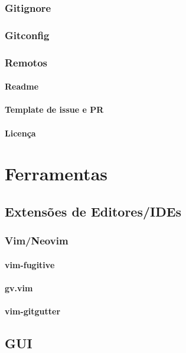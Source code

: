 \documentclass{apostila}
\begin{document}
\subsection{Gitignore}
\subsection{Gitconfig}
\subsection{Remotos}
\subsubsection{Readme}
\subsubsection{Template de issue e PR}
\subsubsection{Licença}

\chapter{Ferramentas}
\section{Extensões de Editores/IDEs}
\subsection{Vim/Neovim}
\subsubsection{vim-fugitive}
\subsubsection{gv.vim}
\subsubsection{vim-gitgutter}

\section{GUI}
\end{document}
